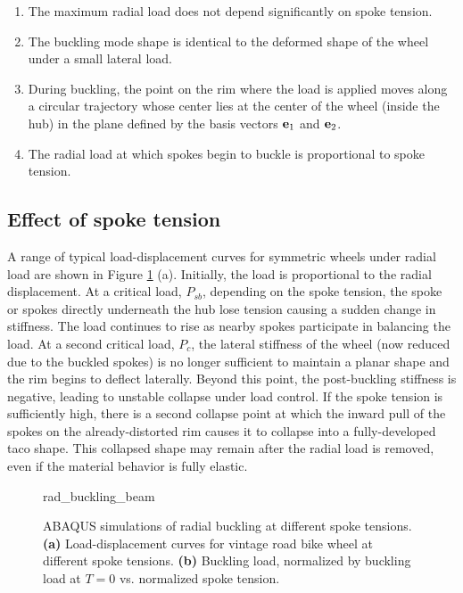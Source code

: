 \documentclass[\rootdir/thesis.tex]{subfiles}
\begin{document}
\begin{enumerate}
\item{The maximum radial load does not depend significantly on spoke tension.}\label{assum:no_T_effect}
\item{The buckling mode shape is identical to the deformed shape of the wheel under a small lateral load.}\label{assum:lat_shape}
\item{During buckling, the point on the rim where the load is applied moves along a circular trajectory whose center lies at the center of the wheel (inside the hub) in the plane defined by the basis vectors $\mathbf{e}_1$ and $\mathbf{e}_2$.}\label{assum:circ_path}
\item{The radial load at which spokes begin to buckle is proportional to spoke tension.}\label{assum:Psb_T}
\end{enumerate}

\subsection{Effect of spoke tension}

A range of typical load-displacement curves for symmetric wheels under radial load are shown in Figure \ref{fig:rad_buckling_beam} (a). Initially, the load is proportional to the radial displacement. At a critical load, $P_{sb}$, depending on the spoke tension, the spoke or spokes directly underneath the hub lose tension causing a sudden change in stiffness. The load continues to rise as nearby spokes participate in balancing the load. At a second critical load, $P_c$, the lateral stiffness of the wheel (now reduced due to the buckled spokes) is no longer sufficient to maintain a planar shape and the rim begins to deflect laterally. Beyond this point, the post-buckling stiffness is negative, leading to unstable collapse under load control. If the spoke tension is sufficiently high, there is a second collapse point at which the inward pull of the spokes on the already-distorted rim causes it to collapse into a fully-developed taco shape. This collapsed shape may remain after the radial load is removed, even if the material behavior is fully elastic.

\begin{figure}
\centering
{rad_buckling_beam}
\caption{ABAQUS simulations of radial buckling at different spoke tensions. \textbf{(a)} Load-displacement curves for vintage road bike wheel at different spoke tensions. \textbf{(b)} Buckling load, normalized by buckling load at $T=0$ vs. normalized spoke tension.}
\label{fig:rad_buckling_beam}
\end{figure}
\end{document}
